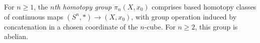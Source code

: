 
For $n\ge1$, the \emph{$n$th homotopy group} $\pi_n(X,x_0)$ comprises based homotopy classes of continuous maps $(S^n,*)\to(X,x_0)$, with group operation induced by concatenation in a chosen coordinate of the $n$-cube. For $n\ge2$, this group is abelian.
